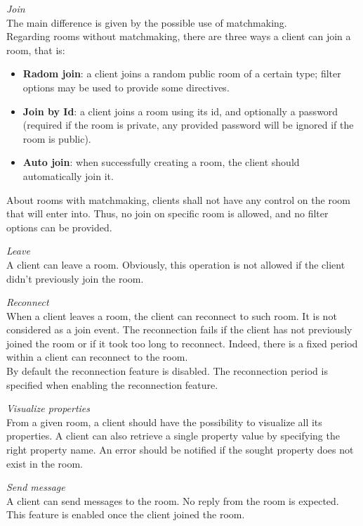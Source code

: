 \bigskip
\textit{Join}
\\
The main difference is given by the possible use of matchmaking.
\\
Regarding rooms without matchmaking, there are three ways a client can join a room, that is:
\begin{itemize}
\item \textbf{Radom join}: a client joins a random public room of a certain type; filter options may be used to provide some directives.
\item \textbf{Join by Id}: a client joins a room using its id, and optionally a password (required if the room is private, any provided password will be ignored if the room is public).
\item \textbf{Auto join}: when successfully creating a room, the client should automatically join it.
\end{itemize} 

About rooms with matchmaking, clients shall not have any control on the room that will enter into. Thus, no join on specific room is allowed, and no filter options can be provided. 

\bigskip
\textit{Leave}
\\
A client can leave a room. Obviously, this operation is not allowed if the client didn't previously join the room. 

\bigskip
\textit{Reconnect}
\\
When a client leaves a room, the client can reconnect to such room. It is not considered as a join event.
The reconnection fails if the client has not previously joined the room or if it took too long to reconnect. Indeed, there is a fixed period within a client can reconnect to the room.
\\
By default the reconnection feature is disabled. The reconnection period is specified when enabling the reconnection feature.

\bigskip
\textit{Visualize properties}
\\
From a given room, a client should have the possibility to visualize all its properties. A client can also retrieve a single property value by specifying the right property name. An error should be notified if the sought property does not exist in the room.

\bigskip
\textit{Send message}
\\
A client can send messages to the room. No reply from the room is expected.
This feature is enabled once the client joined the room.

